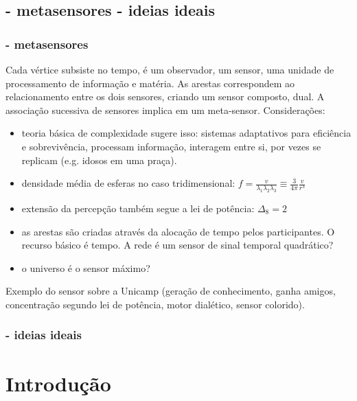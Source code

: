 \documentclass[10pt]{beamer}
\begin{document}
\subsection{- metasensores \;\; - ideias ideais}
\begin{frame}
\frametitle{- metasensores}

Cada vértice subsiste no tempo, é um observador, um sensor, uma unidade de processamento de informação e matéria. As arestas correspondem ao relacionamento entre os dois sensores, criando um sensor composto, dual. A associação sucessiva de sensores implica em um meta-sensor. Considerações:

\begin{itemize}
	\item teoria básica de complexidade sugere isso: sistemas adaptativos para eficiência e sobrevivência, processam informação, interagem entre si, por vezes se replicam (e.g. idosos em uma praça).
	\item densidade média de esferas no caso tridimensional: $f=\frac{v}{\lambda_1 \lambda_2 \lambda_3}\equiv \frac{3}{4 \pi} \frac{v}{r^3}$
	\item extensão da percepção também segue a lei de potência: $\Delta_8=2^{}$
	\item as arestas são criadas através da alocação de tempo pelos participantes. O recurso básico é tempo. A rede é um sensor de sinal temporal quadrático?
	\item o universo é o sensor máximo?
\end{itemize}

Exemplo do sensor sobre a Unicamp (geração de conhecimento, ganha amigos, concentração segundo lei de potência, motor dialético, sensor colorido).
\end{frame}

\begin{frame}
\frametitle{- ideias ideais}
\end{frame}

\section{Introdução}
\end{document}
